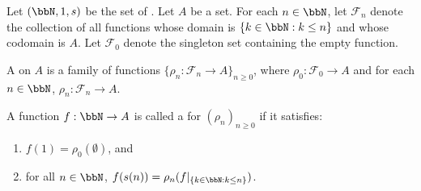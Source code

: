 \begin{definition} \label{definition:course_of_values_recursion}
Let $(\bbN, 1, s)$ be the set of . Let $A$ be a set. For each $n \in \bbN$, let $\mathcal{F}_n$ denote the collection of all functions whose domain is $\{k \in \bbN : k \leq n\}$ and whose codomain is $A$. Let $\mathcal{F}_0$ denote the singleton set containing the empty function.

A  on $A$ is a family of functions $\{\rho_n : \mathcal{F}_n \to A\}_{n \geq 0}$, where $\rho_0: \mathcal{F}_0 \to A$ and for each $n \in \bbN$, $\rho_n: \mathcal{F}_n \to A$.

A function $f: \bbN \to A$ is called a  for $(\rho_n)_{n \geq 0}$ if it satisfies:
\begin{enumerate}
    \item $f(1) = \rho_0(\emptyset)$, and
    \item for all $n \in \bbN$, $f(s(n)) = \rho_n(f|_{\{k \in \bbN : k \leq n\}})$.
\end{enumerate}
\end{definition}

